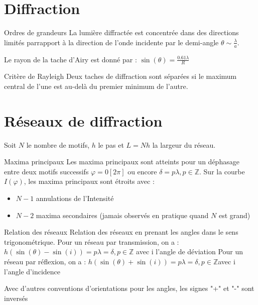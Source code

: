 \documentclass[french, a4paper, 11pt, twocolumn]{article}
\newcommand{\Z}{\mathbb{Z}}   %
\begin{document}
\section{Diffraction}
\begin{cadre}{Ordres de grandeurs}
    La lumière diffractée est concentrée dans des directions limités parrapport à
    la direction de l'onde incidente par le demi-angle \(\theta\sim \frac{\lambda}{a}\).

    Le rayon de la tache d'Airy est donné par : \(\sin(\theta)=\frac{0.61\lambda}{R}\)
\end{cadre}

\begin{cadre}{Critère de Rayleigh}
    Deux taches de diffraction sont séparées si le maximum central de l'une est au-delà
    du premier minimum de l'autre.
\end{cadre}

\section{Réseaux de diffraction}
Soit \(N\) le nombre de motifs, \(h\) le pas et \(L=Nh\) la largeur du réseau.

\begin{cadre}{Maxima principaux}
    Les maxima principaux sont atteints pour un déphasage entre deux motifs successifs
    \(\varphi=0[2\pi]\) ou encore \(\delta=p\lambda, p \in \Z\).
    Sur la courbe \(I(\varphi)\), les maxima principaux sont étroits avec :
    \begin{itemize}
        \item \(N-1\) annulations de l'Intensité
        \item \(N-2\) maxima secondaires (jamais observés en pratique quand \(N\) est grand)
    \end{itemize}
\end{cadre}

\begin{cadre}{Relation des réseaux}
    Relation des réseaux en prenant les angles dans le sens trigonométrique.
    Pour un réseau par transmission, on a :
        \(h(\sin(\theta)-\sin(i))=p\lambda=\delta, p \in \Z\) avec i l'angle de déviation
    Pour un réseau par réflexion, on a :
        \(h(\sin(\theta)+\sin(i))=p\lambda=\delta, p \in \Z\)avec i l'angle d'incidence
    
    \tcblower
    Avec d'autres conventions d'orientations pour les angles, les signes "+" et "-" sont inversés
\end{cadre}
\end{document}
